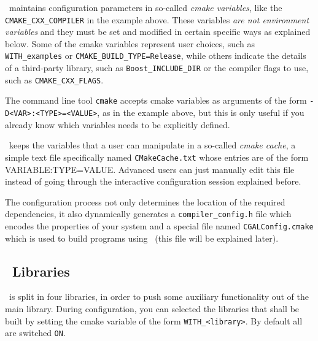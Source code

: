 \cmake\ maintains configuration parameters in so-called {\em cmake variables}, like the \texttt{CMAKE\_CXX\_COMPILER}
in the example above. These variables {\em are not environment variables} and they must be set and modified in
certain specific ways as explained below. Some of the cmake variables represent user choices, such as
\texttt{WITH\_examples} or \texttt{CMAKE\_BUILD\_TYPE=Release}, while others indicate the details of a third-party library, 
such as \texttt{Boost\_INCLUDE\_DIR} or the compiler flags to use, such as \texttt{CMAKE\_CXX\_FLAGS}. 

The command line tool \texttt{cmake} accepts cmake variables as arguments of the form \texttt{-D<VAR>:<TYPE>=<VALUE>}, as
in the example above, but this is only useful if you already know which variables needs to be explicitly defined.

\begin{ccAdvanced}
\cmake\ keeps the variables that a user can manipulate in a so-called {\em cmake cache}, a simple text file specifically 
named \texttt{CMakeCache.txt} whose entries are of the form VARIABLE:TYPE=VALUE. Advanced users can just manually edit this 
file instead of going through the interactive configuration session explained before.
\end{ccAdvanced}


The configuration process not only determines the location of the required dependencies, it also dynamically generates a
\texttt{compiler\_config.h} file which encodes the properties of your system and a special file named 
\texttt{CGALConfig.cmake} which is used to build programs using \cgal\ (this file will be explained later).

\subsection{\cgal\ Libraries}

\cgal\ is split in four libraries, in order to push some auxiliary 
functionality out of the main library. During configuration, you can selected the libraries that 
shall be built by setting the cmake variable of the form {\tt WITH\_<library>}. By default all 
are switched \texttt{ON}.

